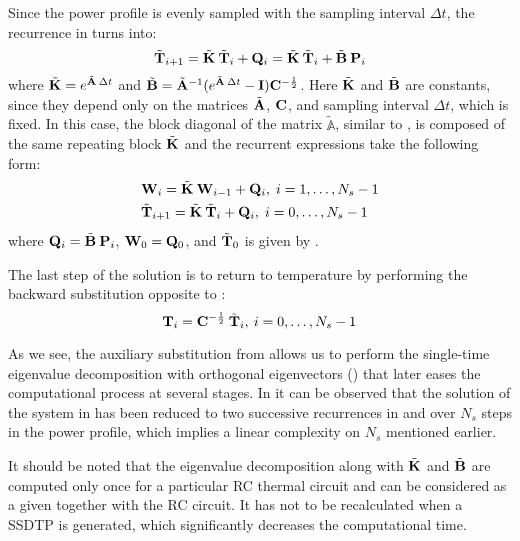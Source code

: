 Since the power profile is evenly sampled with the sampling interval $\Delta t$, the recurrence in  turns into:
\[
  \tilde{\mathbf{T}}_{i+1} = \tilde{\mathbf{K}} \: \tilde{\mathbf{T}}_i + \mathbf{Q}_i = \tilde{\mathbf{K}} \: \tilde{\mathbf{T}}_i + \tilde{\mathbf{B}} \: \mathbf{P}_i
\]
where $\tilde{\mathbf{K}} = e^{\tilde{\mathbf{A}} \: \Delta t}$ and $\tilde{\mathbf{B}} = \tilde{\mathbf{A}}^{-1} ( e^{\tilde{\mathbf{A}} \: \Delta t} - \mathbf{I} ) \mathbf{C}^{-\frac{1}{2}}$. Here $\tilde{\mathbf{K}}$ and $\tilde{\mathbf{B}}$ are constants, since they depend only on the matrices $\tilde{\mathbf{A}}$, $\mathbf{C}$, and sampling interval $\Delta t$, which is fixed. In this case, the block diagonal of the matrix $\tilde{\mathbb{A}}$, similar to , is composed of the same repeating block $\tilde{\mathbf{K}}$ and the recurrent expressions take the following form:
\begin{align}
  & \mathbf{W}_i = \tilde{\mathbf{K}} \: \mathbf{W}_{i - 1} + \mathbf{Q}_i, \; i = 1, \dots, N_s - 1 \label{eq:final-p-recurrence} \\
  & \tilde{\mathbf{T}}_{i + 1} = \tilde{\mathbf{K}} \: \tilde{\mathbf{T}}_i + \mathbf{Q}_i, \; i = 0, \dots, N_s - 1 \label{eq:final-y-recurrence}
\end{align}
where $\mathbf{Q}_i = \tilde{\mathbf{B}} \: \mathbf{P}_i$, $\mathbf{W}_0 = \mathbf{Q}_0$, and $\tilde{\mathbf{T}}_0$ is given by .

The last step of the solution is to return to temperature by performing the backward substitution opposite to :
\[
  \mathbf{T}_i = \mathbf{C}^{-\frac{1}{2}} \: \tilde{\mathbf{T}}_i, \: i = 0, \dots, N_s - 1
\]

As we see, the auxiliary substitution from  allows us to perform the single-time eigenvalue decomposition with orthogonal eigenvectors () that later eases the computational process at several stages. In  it can be observed that the solution of the system in  has been reduced to two successive recurrences in  and  over $N_s$ steps in the power profile, which implies a linear complexity on $N_s$ mentioned earlier.

It should be noted that the eigenvalue decomposition along with $\tilde{\mathbf{K}}$ and $\tilde{\mathbf{B}}$ are computed only once for a particular RC thermal circuit and can be considered as a given together with the RC circuit. It has not to be recalculated when a SSDTP is generated, which significantly decreases the computational time.
